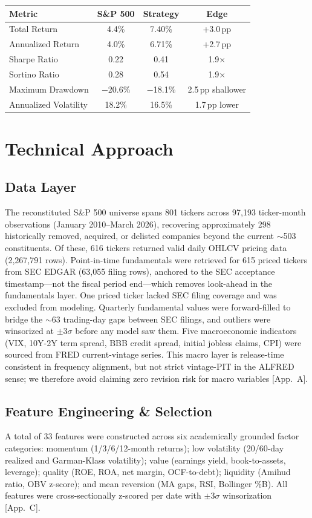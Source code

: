 \documentclass[11pt, a4paper]{article}
\begin{document}
\begin{table}[h]
\centering
\begin{tabular}{lccc}
\toprule
\textbf{Metric} & \textbf{S\&P 500} & \textbf{Strategy} & \textbf{Edge} \\
\midrule
Total Return & 4.4\% & 7.40\% & +3.0\,pp \\
Annualized Return & 4.0\% & 6.71\% & +2.7\,pp \\
Sharpe Ratio & 0.22 & 0.41 & 1.9$\times$ \\
Sortino Ratio & 0.28 & 0.54 & 1.9$\times$ \\
Maximum Drawdown & $-$20.6\% & $-$18.1\% & 2.5\,pp shallower \\
Annualized Volatility & 18.2\% & 16.5\% & 1.7\,pp lower \\
\bottomrule
\end{tabular}
\end{table}

\section{Technical Approach}

\subsection{Data Layer}
The reconstituted S\&P 500 universe spans 801 tickers across 97,193 ticker-month observations (January 2010--March 2026), recovering approximately 298 historically removed, acquired, or delisted companies beyond the current $\sim$503 constituents. Of these, 616 tickers returned valid daily OHLCV pricing data (2,267,791 rows). Point-in-time fundamentals were retrieved for 615 priced tickers from SEC EDGAR (63,055 filing rows), anchored to the SEC acceptance timestamp---not the fiscal period end---which removes look-ahead in the fundamentals layer. One priced ticker lacked SEC filing coverage and was excluded from modeling. Quarterly fundamental values were forward-filled to bridge the $\sim$63 trading-day gaps between SEC filings, and outliers were winsorized at $\pm 3\sigma$ before any model saw them. Five macroeconomic indicators (VIX, 10Y-2Y term spread, BBB credit spread, initial jobless claims, CPI) were sourced from FRED current-vintage series. This macro layer is release-time consistent in frequency alignment, but not strict vintage-PIT in the ALFRED sense; we therefore avoid claiming zero revision risk for macro variables [App.\ A].

\subsection{Feature Engineering \& Selection}
A total of 33 features were constructed across six academically grounded factor categories: momentum (1/3/6/12-month returns); low volatility (20/60-day realized and Garman-Klass volatility); value (earnings yield, book-to-assets, leverage); quality (ROE, ROA, net margin, OCF-to-debt); liquidity (Amihud ratio, OBV z-score); and mean reversion (MA gaps, RSI, Bollinger \%B). All features were cross-sectionally z-scored per date with $\pm 3\sigma$ winsorization [App.\ C].
\end{document}
